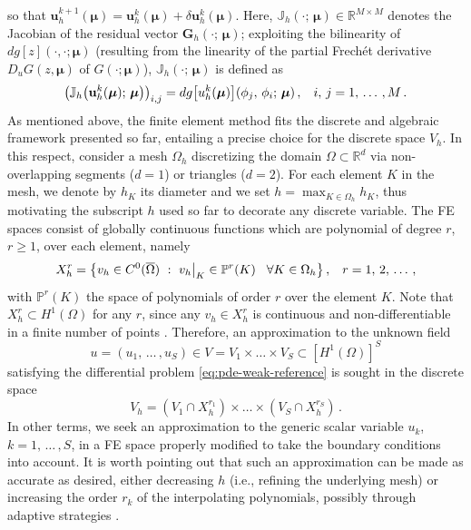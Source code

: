 \documentclass[12pt, a4paper, twoside, openright, notitlepage]{report}
\numberwithin{equation}{chapter}
\theoremstyle{theorem}
\theoremstyle{definition}
\theoremstyle{remark}
\theoremstyle{proposition}
\numberwithin{figure}{chapter}
\newcommand{\bg}[1]{\boldsymbol{#1}}
\begin{document}
		so that $\mathbf{u}^{k+1}_h(\bg{\mu}) = \mathbf{u}^k_h(\bg{\mu}) + \delta \mathbf{u}^k_h(\bg{\mu})$. Here, $\mathbb{J}_h(\cdot; \, \bg{\mu}) \in \mathbb{R}^{M \times M}$ denotes the Jacobian of the residual vector $\mathbf{G}_h(\cdot; \, \bg{\mu})$; exploiting the bilinearity of $dg[z](\cdot, \cdot; \bg{\mu})$ (resulting from the linearity of the partial Frech\'et derivative $D_u G(z, \bg{\mu})$ of $G(\cdot; \bg{\mu})$), $\mathbb{J}_h(\cdot; \, \bg{\mu})$ is defined as
		\begin{equation*}
			\left( \mathbb{J}_h \big( \mathbf{u}^k_h(\bg{\mu}); \, \bg{\mu} \big) \right)_{i,j} = dg\big[u^k_h(\bg{\mu})\big](\phi_j, \, \phi_i; \, \bg{\mu}) \, , \hspace*{0.3cm} i, \, j = 1, \, \ldots \, , M \, .
		\end{equation*}
		As mentioned above, the finite element method fits the discrete and algebraic framework presented so far, entailing a precise choice for the discrete space $V_h$. In this respect, consider a mesh $\Omega_h$ discretizing the domain $\Omega \subset \mathbb{R}^d$ via non-overlapping segments ($d = 1$) or triangles ($d = 2$). For each element $K$ in the mesh, we denote by $h_K$ its diameter and we set $h = \max_{K \in \Omega_h} h_K$, thus motivating the subscript $h$ used so far to decorate any discrete variable. The FE spaces consist of globally continuous functions which are polynomial of degree $r$, $r \geq 1$, over each element, namely
		\begin{equation*}
			X_h^r = \big\lbrace v_h \in C^0 ( \overline{\Omega} ) ~ : ~ v_h \big\rvert_K \in \mathbb{P}^r(K) \hspace*{0.3cm} \forall K \in \Omega_h \big\rbrace \, , \hspace*{0.3cm} r = 1, \, 2, \, \ldots \, ,
		\end{equation*}
		with $\mathbb{P}^r(K)$ the space of polynomials of order $r$ over the element $K$. Note that $X_h^r \subset H^1(\Omega)$ for any $r$, since any $v_h \in X_h^r$ is continuous and non-differentiable in a finite number of points \cite{QMN15}. Therefore, an approximation to the unknown field
		\begin{equation}
			\label{eq:notation-1}
			u = \left( u_1, \, \ldots \, , u_S \right) \in V = V_1 \times \ldots \times V_S \subset \left[ H^1(\Omega) \right]^S
		\end{equation}  
		satisfying the differential problem \eqref{eq:pde-weak-reference} is sought in the discrete space
		\begin{equation}
			\label{eq:notation-2}
			V_h = \left( V_1 \cap X_h^{r_1} \right) \times \ldots \times \left( V_S \cap X_h^{r_S} \right) \, .
		\end{equation}
		In other terms, we seek an approximation to the generic scalar variable $u_k$, $k = 1, \, \ldots \, , S$, in a FE space properly modified to take the boundary conditions into account. It is worth pointing out that such an approximation can be made as accurate as desired, either decreasing $h$ (i.e., refining the underlying mesh) or increasing the order $r_k$ of the interpolating polynomials, possibly through adaptive strategies \cite{Qua10}. 
		
\end{document}
